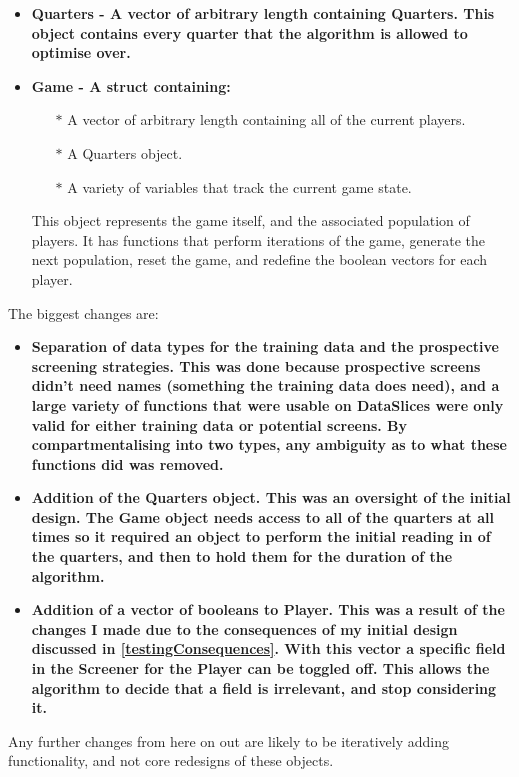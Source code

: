 \begin{itemize}
    \item \bf Quarters \rm - A vector of arbitrary length containing Quarters. This object contains every quarter that the algorithm is allowed to optimise over.
    \item \bf Game \rm - A struct containing:
    \begin{itemize}
        \item[$\ast$] A vector of arbitrary length containing all of the current players.
        \item[$\ast$] A Quarters object.
        \item[$\ast$] A variety of variables that track the current game state.
    \end{itemize}
        This object represents the game itself, and the associated population of players. It has functions that perform iterations of the game, generate the next population, reset the game, and redefine the boolean vectors for each player.
\end{itemize}

The biggest changes are:
\begin{itemize}
    \item \bf Separation of data types for the training data and the prospective screening strategies. \rm This was done because prospective screens didn't need names (something the training data does need), and a large variety of functions that were usable on DataSlices were only valid for either training data or potential screens. By compartmentalising into two types, any ambiguity as to what these functions did was removed.
    \item \bf Addition of the Quarters object. \rm This was an oversight of the initial design. The Game object needs access to all of the quarters at all times so it required an object to perform the initial reading in of the quarters, and then to hold them for the duration of the algorithm.
    \item \bf Addition of a vector of booleans to Player. \rm This was a result of the changes I made due to the consequences of my initial design discussed in \ref{testingConsequences}. With this vector a specific field in the Screener for the Player can be toggled off. This allows the algorithm to decide that a field is irrelevant, and stop considering it.
\end{itemize}

Any further changes from here on out are likely to be iteratively adding functionality, and not core redesigns of these objects.

